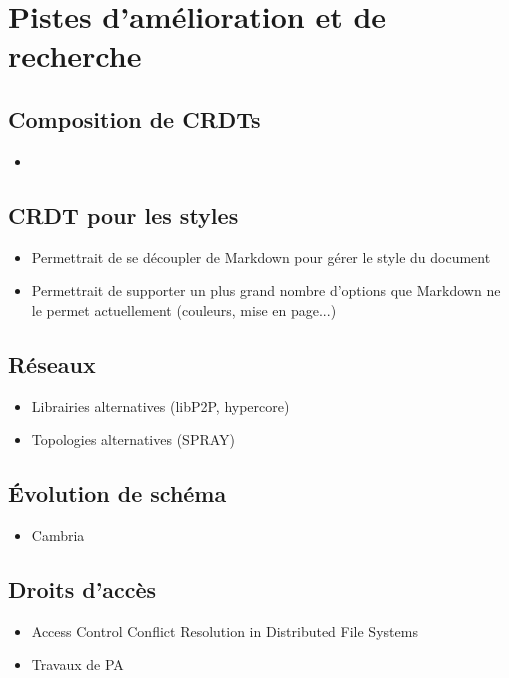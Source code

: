 \documentclass[12pt]{thesul}
\begin{document}
\section{Pistes d'amélioration et de recherche}

\subsection{Composition de CRDTs}

\begin{itemize}
  \item
\end{itemize}

\subsection{CRDT pour les styles}

\begin{itemize}
  \item Permettrait de se découpler de Markdown pour gérer le style du document
  \item Permettrait de supporter un plus grand nombre d'options que Markdown ne le permet actuellement (couleurs, mise en page...)
\end{itemize}

\subsection{Réseaux}
\begin{itemize}
  \item Librairies alternatives (libP2P, hypercore)
  \item Topologies alternatives (SPRAY)
\end{itemize}
\subsection{Évolution de schéma}
\begin{itemize}
  \item Cambria \cite{2021-cambria-schema-evolution}
\end{itemize}
\subsection{Droits d'accès}
\begin{itemize}
  \item Access Control Conflict Resolution in Distributed File Systems \cite{2021-access-control-crdts}
  \item Travaux de PA
\end{itemize}
\end{document}
